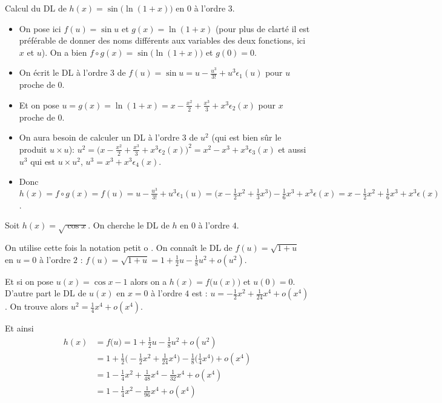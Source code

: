 \documentclass[class=report,crop=false]{standalone}
\begin{document}
\begin{exemple}
Calcul du DL de $h(x)=\sin\big(\ln(1+x)\big)$ en $0$ à l'ordre $3$.

\begin{itemize}
  \item On pose ici $f(u)=\sin u$ et $g(x)=\ln(1+x)$ (pour plus de clarté il est préférable de donner 
  des noms différents aux variables des deux fonctions, ici $x$ et $u$).
On a bien $f\circ g(x) = \sin\big(\ln(1+x)\big)$ et $g(0)=0$.

  \item On écrit le DL à l'ordre 3 de $f(u)=\sin u = u-\frac{u^3}{3!}+u^3\epsilon_1(u)$ pour $u$ proche de $0$.

  \item Et on pose $u=g(x)=\ln(1+x)=x-\frac{x^2}{2}+\frac{x^3}{3}+x^3\epsilon_2(x)$ pour $x$ proche de $0$.

  \item On aura besoin de calculer un DL à l'ordre 3 de $u^2$ (qui est bien sûr le produit $u\times u$):
$u^2 = \big(x-\frac{x^2}{2}+\frac{x^3}{3}+x^3\epsilon_2(x)\big)^2 = x^2-x^3+x^3\epsilon_3(x)$
et aussi $u^3$ qui est $u \times u^2$, $u^3=x^3+x^3\epsilon_4(x)$.
  \item Donc
$h(x)=f\circ g(x)= f(u) = u-\frac{u^3}{3!}+u^3\epsilon_1(u)=
\big(x-\frac{1}{2}x^{2}+\frac{1}{3}x^3\big) -\frac16 x^3  +x^3\epsilon(x)
= x-\frac{1}{2}x^{2}+\frac16 x^3  +x^3\epsilon(x)$.
\end{itemize}
\end{exemple}


\begin{exemple}
Soit $h(x)=\sqrt{\cos x}$. On cherche le DL de $h$ en $0$ à l'ordre $4$.

On utilise cette fois la notation \og petit o \fg{}.
On connaît le DL de $f(u)=\sqrt{1+u}$ en $u=0$ à l'ordre $2$ :
$f(u)=\sqrt{1+u}=1+\frac{1}{2}u-\frac{1}{8}u^2 + o(u^2)$.

Et si on pose $u(x)=\cos x-1$ alors on a $h(x)= f\big(u(x)\big)$ et $u(0)=0$.
D'autre part le DL de $u(x)$ en $x=0$ à l'ordre $4$ est :
$u=-\frac{1}{2}x^2+\frac{1}{24}x^4+o(x^4)$.
On trouve alors
$u^2 = \frac{1}{4}x^4 + o(x^4)$.


Et ainsi
\begin{align*}
h(x) & = f\big(u\big) = 1+\frac{1}{2}u-\frac{1}{8}u^2 + o(u^2) \\
     & = 1 + \frac{1}{2}\big(-\frac{1}{2}x^2+\frac{1}{24}x^4\big)-\frac{1}{8}\big(\frac{1}{4}x^4\big) + o(x^4) \\
     & =1-\frac{1}{4}x^2+\frac{1}{48}x^4 -\frac{1}{32}x^4+o(x^4) \\
     & = 1-\frac{1}{4}x^2-\frac{1}{96}x^4+o(x^4) \\
\end{align*}
\end{exemple}
\end{document}
